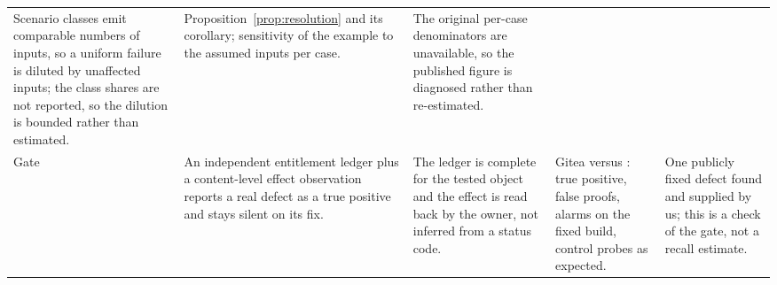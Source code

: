 \begin{table}[t]
\begin{tabular}{@{}p{}p{}p{}p{}p{}@{}}
Scenario classes emit comparable numbers of inputs, so a uniform failure is
diluted by unaffected inputs; the class shares are not reported, so the
dilution is bounded rather than estimated. &
Proposition~\ref{prop:resolution} and its corollary; sensitivity of the example
to the assumed inputs per case. &
The original per-case denominators are unavailable, so the published figure is
diagnosed rather than re-estimated. \\
\addlinespace
Gate &
An independent entitlement ledger plus a content-level effect observation
reports a real defect as a true positive and stays silent on its fix. &
The ledger is complete for the tested object and the effect is read back by the
owner, not inferred from a status code. &
Gitea \CveVulnVersion{} versus \CveFixedVersion{}: \CveTruePositives{} true
positive, \CveFalseProofs{} false proofs, \CveFixedAlarms{} alarms on the fixed
build, \CveControls{} control probes as expected. &
One publicly fixed defect found and supplied by us; this is a check of the gate,
not a recall estimate. \\
\bottomrule
\end{tabular}
\end{table}
